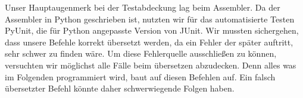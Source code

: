 Unser Hauptaugenmerk bei der Testabdeckung lag beim Assembler. Da der Assembler in Python geschrieben ist, nutzten wir  für das automatisierte Testen PyUnit, die für Python angepasste Version von JUnit.
Wir mussten sichergehen, dass unsere Befehle korrekt übersetzt werden, da ein Fehler der später auftritt, sehr schwer zu finden wäre. Um diese Fehlerquelle ausschließen zu können, versuchten wir möglichst alle Fälle beim übersetzen abzudecken. Denn alles was im Folgenden programmiert wird, baut auf diesen Befehlen auf. Ein falsch übersetzter Befehl könnte daher schwerwiegende Folgen haben. 
